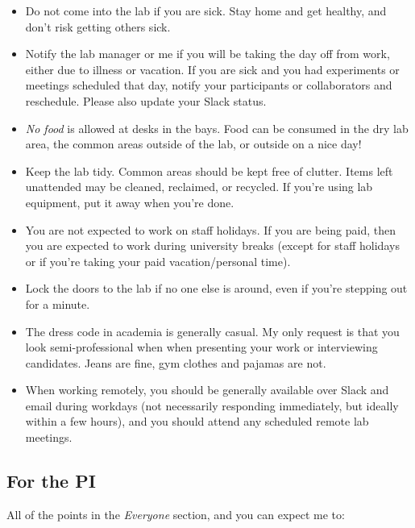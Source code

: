\documentclass[
]{book}
\providecommand{\tightlist}{%
  \setlength{\itemsep}{0pt}\setlength{\parskip}{0pt}}
\begin{document}
\begin{itemize}
\tightlist
\item
  Do not come into the lab if you are sick. Stay home and get healthy, and don't risk getting others sick.
\item
  Notify the lab manager or me if you will be taking the day off from work, either due to illness or vacation. If you are sick and you had experiments or meetings scheduled that day, notify your participants or collaborators and reschedule. Please also update your Slack status.
\item
  \emph{No food} is allowed at desks in the bays. Food can be consumed in the dry lab area, the common areas outside of the lab, or outside on a nice day!
\item
  Keep the lab tidy. Common areas should be kept free of clutter. Items left unattended may be cleaned, reclaimed, or recycled. If you're using lab equipment, put it away when you're done.
\item
  You are not expected to work on staff holidays. If you are being paid, then you are expected to work during university breaks (except for staff holidays or if you're taking your paid vacation/personal time).
\item
  Lock the doors to the lab if no one else is around, even if you're stepping out for a minute.
\item
  The dress code in academia is generally casual. My only request is that you look semi-professional when when presenting your work or interviewing candidates. Jeans are fine, gym clothes and pajamas are not.
\item
  When working remotely, you should be generally available over Slack and email during workdays (not necessarily responding immediately, but ideally within a few hours), and you should attend any scheduled remote lab meetings.
\end{itemize}

\hypertarget{for-the-pi}{%
\subsection{For the PI}\label{for-the-pi}}

All of the points in the \emph{Everyone} section, and you can expect me to:
\end{document}
